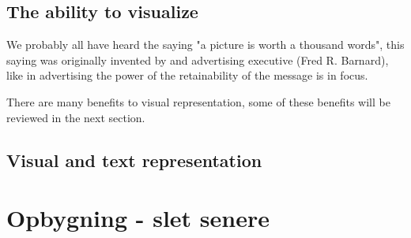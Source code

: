 
\subsection{The ability to visualize}\label{ch:the_ability_to_visualize}
We probably all have heard the saying "a picture is worth a thousand words", this saying was originally invented by and advertising executive (Fred R. Barnard)\cite*{phrases2022}, like in advertising the power of the retainability of the message is in focus. 



There are many benefits to visual representation, some of these benefits will be reviewed in the next section.
\subsection{Visual and text representation}\label{ch:visual_and_text_representation}



\section{Opbygning - slet senere}\label{ch:opbygning}


